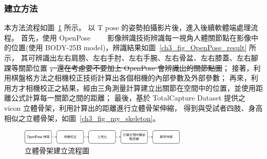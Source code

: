 \subsubsection{建立方法}
本方法流程如圖~\ref{ch3_fig_skeleton_flow} 所示。
以 T pose 的姿勢拍攝影片後，進入後續軟體端處理流程。
首先，使用 OpenPose~\cite{8765346}~\cite{wei2016cpm}~\cite{simon2017hand}~\cite{cao2017realtime}
影像辨識技術辨識每一視角人體關節點在影像中的位置(使用 BODY-25B model)，辨識結果如圖~\ref{ch3_fig_OpenPose_result} 所示，
其可辨識出左右肩膀、左右手肘、左右手腕、左右骨盆、左右膝蓋、左右腳踝等關節位置 \sout{，還在考慮要不要加上 OpenPose 會辨識出的關節點圖}；
接著，利用棋盤格方法之相機校正技術計算出各個相機的內部參數及外部參數；
再來，利用方才相機校正之結果，經由三角測量計算建立出關節在空間中的位置，並使用距離公式計算每一關節之間的距離；
最後，基於 TotalCapture Dataset 提供之 vicon 立體骨架，利用計算出的距離進行立體骨架伸縮，
得到與受試者四肢、身高相似之立體骨架，如圖~\ref{ch3_fig_my_skeleton}。

\begin{figure}[!ht]
   \centering
   \includegraphics[width=8cm]{figure/ch3_fig_skeleton_flow.png}
    \caption[立體骨架建立流程圖]{立體骨架建立流程圖}
    \label{ch3_fig_skeleton_flow}
\end{figure}

